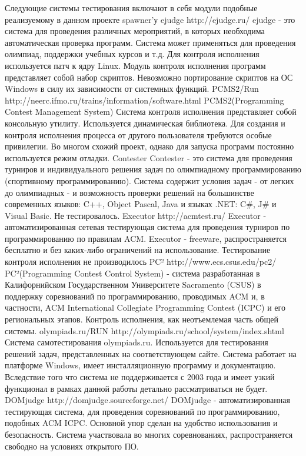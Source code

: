 \documentclass{imcs}
\begin{document}
Следующие системы тестирования включают в себя модули подобные реализуемому в данном проекте spawner’у
ejudge http://ejudge.ru/   
ejudge - это система для проведения различных мероприятий, в которых необходима автоматическая проверка программ. Система может применяться для проведения олимпиад,
поддержки учебных курсов и т.д.
Для контроля исполнения используется патч к ядру Linux. Модуль контроля исполнения программ представляет собой набор скриптов. Невозможно портирование скриптов на ОС Windows в силу их зависимости от системных функций.
PCMS2/Run http://neerc.ifmo.ru/trains/information/software.html
PCMS2(Programming Contest Management System)
Система контроля исполнения представляет собой консольную утилиту. Используется динамическая библиотека. Для создания и контроля исполнения процесса от другого пользователя требуются особые привилегии.
Во многом схожий проект, однако для запуска программ постоянно используется режим отладки.
Contester
Contester - это система для проведения турниров и индивидуального решения задач по олимпиадному программированию (спортивному программированию). Система содержит условия задач - от легких до олимпиадных - и возможность проверки решений на большинстве современных языков: C++, Object Pascal, Java и языках .NET: C\#, J\# и Visual Basic.
Не тестировалось.
Executor http://acmtest.ru/
Executor - автоматизированная сетевая тестирующая система для проведения турниров по программированию по правилам ACM. Executor - freeware, распространяется бесплатно и без каких-либо ограничений на использование.
Тестирование контроля исполнения не производилось
PC² http://www.ecs.csus.edu/pc2/
PC²(Programming Contest Control System) - система разработанная в Калифорнийском Государственном Университете Sacramento (CSUS) в поддержку соревнований по программированию, проводимых ACM и, в частности, ACM International Collegiate Programming Contest (ICPC) и его региональных этапов. 
Контроль исполнения, как неотъемлемая часть общей системы.
olympiads.ru/RUN http://olympiads.ru/school/system/index.shtml
Система самотестирования olympiads.ru. Используется для тестирования решений задач, представленных на соответствующем сайте. Система работает на платформе Windows, имеет инсталляционную программу и документацию. 
Вследствие того что система не поддерживается с 2003 года и имеет узкий функционал в рамках данной работы детально рассматриваться не будет.
DOMjudge http://domjudge.sourceforge.net/
DOMjudge - автоматизированная тестирующая система, для проведения соревнований по программированию, подобных ACM ICPC. Основной упор сделан на удобство использования и безопасность. Система участвовала во многих соревнованиях, распространяется свободно на условиях открытого ПО. 
\end{document}
